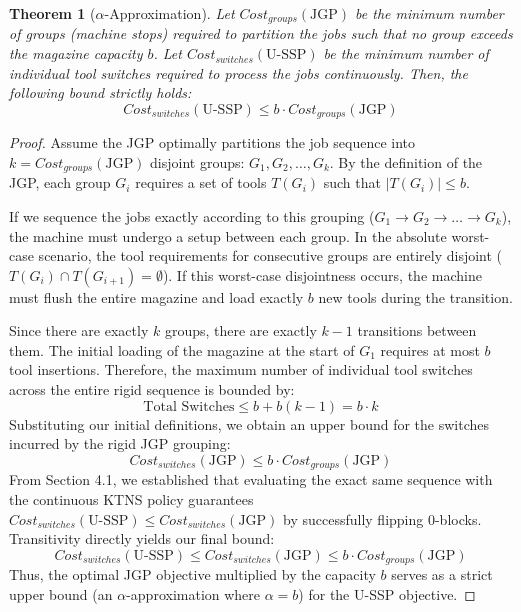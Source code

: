 \documentclass[12pt]{article}
\newtheorem{theorem}{Theorem}[section]
\begin{document}
\begin{theorem}[$\alpha$-Approximation]
	Let $Cost_{groups}(\text{JGP})$ be the minimum number of groups (machine stops) required to partition the jobs such that no group exceeds the magazine capacity $b$. Let $Cost_{switches}(\text{U-SSP})$ be the minimum number of individual tool switches required to process the jobs continuously. Then, the following bound strictly holds:
	\begin{equation}
		Cost_{switches}(\text{U-SSP}) \le b \cdot Cost_{groups}(\text{JGP})
	\end{equation}
\end{theorem}
\begin{proof}
	Assume the JGP optimally partitions the job sequence into $k = Cost_{groups}(\text{JGP})$ disjoint groups: $G_1, G_2, \dots, G_k$. By the definition of the JGP, each group $G_i$ requires a set of tools $T(G_i)$ such that $|T(G_i)| \le b$. 
	
	If we sequence the jobs exactly according to this grouping ($G_1 \to G_2 \to \dots \to G_k$), the machine must undergo a setup between each group. In the absolute worst-case scenario, the tool requirements for consecutive groups are entirely disjoint ($T(G_i) \cap T(G_{i+1}) = \emptyset$). If this worst-case disjointness occurs, the machine must flush the entire magazine and load exactly $b$ new tools during the transition. 
	
	Since there are exactly $k$ groups, there are exactly $k - 1$ transitions between them. The initial loading of the magazine at the start of $G_1$ requires at most $b$ tool insertions. Therefore, the maximum number of individual tool switches across the entire rigid sequence is bounded by:
	\begin{equation}
		\text{Total Switches} \le b + b(k - 1) = b \cdot k
	\end{equation}
	Substituting our initial definitions, we obtain an upper bound for the switches incurred by the rigid JGP grouping:
	\begin{equation}
		Cost_{switches}(\text{JGP}) \le b \cdot Cost_{groups}(\text{JGP})
	\end{equation}
	From Section 4.1, we established that evaluating the exact same sequence with the continuous KTNS policy guarantees $Cost_{switches}(\text{U-SSP}) \le Cost_{switches}(\text{JGP})$ by successfully flipping 0-blocks. Transitivity directly yields our final bound:
	\begin{equation}
		Cost_{switches}(\text{U-SSP}) \le Cost_{switches}(\text{JGP}) \le b \cdot Cost_{groups}(\text{JGP})
	\end{equation}
	Thus, the optimal JGP objective multiplied by the capacity $b$ serves as a strict upper bound (an $\alpha$-approximation where $\alpha=b$) for the U-SSP objective.
\end{proof}
\end{document}
